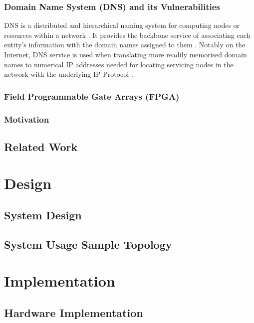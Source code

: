 \documentclass[a4paper]{report}
\begin{document}
\subsection{Domain Name System (DNS) and its Vulnerabilities}
DNS is a distributed and hierarchical naming system for computing nodes or resources within a network \cite{RFC-1034}. It provides the backbone service of associating each entity's information with the domain names assigned to them \cite{RFC-1034, RFC-1035}. Notably on the Internet, DNS service is used when translating more readily memorised domain names to numerical IP addresses needed for locating servicing nodes in the network with the underlying IP Protocol \cite{RFC-1034, RFC-791}.

\subsection{Field Programmable Gate Arrays (FPGA)}

\subsection{Motivation}


\section{Related Work}

\chapter{Design}

\section{System Design}

\section{System Usage Sample Topology}

\chapter{Implementation}

\section{Hardware Implementation}
\end{document}
